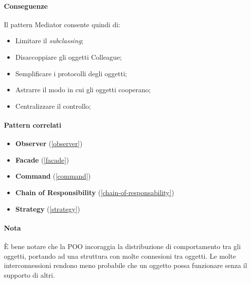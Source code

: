 \paragraph{Conseguenze} Il pattern Mediator consente quindi di:
\begin{itemize}
    \item Limitare il \textit{subclassing};
    \item Disaccoppiare gli oggetti Colleague;
    \item Semplificare i protocolli degli oggetti;
    \item Astrarre il modo in cui gli oggetti cooperano;
    \item Centralizzare il controllo;
\end{itemize}

\paragraph{Pattern correlati}
\begin{itemize}
    \item \textbf{Observer} (\ref{observer})
    \item \textbf{Facade} (\ref{facade})
    \item \textbf{Command} (\ref{command})
    \item \textbf{Chain of Responsibility} (\ref{chain-of-responsability})
    \item \textbf{Strategy} (\ref{strategy})
\end{itemize}


\paragraph{Nota} È bene notare che la POO incoraggia la distribuzione di comportamento tra gli oggetti, portando ad una struttura con molte connesioni tra oggetti. Le molte interconnessioni rendono meno probabile che un oggetto possa funzionare senza il supporto di altri.

\newpage